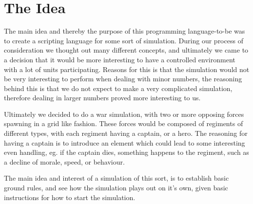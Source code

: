 \section{The Idea}

	The main idea and thereby the purpose of this programming language-to-be 
	was to create a scripting language for some sort of simulation. 
	During our process of consideration we thought out many different concepts, 
	and ultimately we came to a decision that it would be more interesting to 
	have a controlled environment with a lot of units participating. Reasons for 
	this is that the simulation would not be very interesting to perform when dealing with minor numbers, 
	the reasoning behind this is that we do not expect to make a very complicated simulation, therefore dealing in larger numbers proved 
	more interesting to us. \newline
	
	Ultimately we decided to do a war simulation, with two or more opposing forces 
	spawning in a grid like fashion. These forces would be composed of regiments of 
	different types, with each regiment having a captain, or a hero. The reasoning for having a 
	captain is to introduce an element which could lead to some interesting even handling, 
	eg. if the captain dies, something happens to the regiment, such as a decline of morale, speed, or behaviour. \newline
	
	The main idea and interest of a simulation of this sort, is to establish basic ground rules, and see how the simulation plays out on it's own, given basic instructions for how to start the 				simulation.